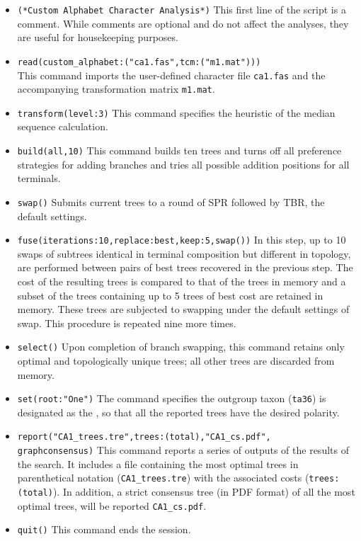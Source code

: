 \begin{itemize}
\item \texttt{(*Custom Alphabet Character Analysis*)} This first
line of the script is a comment. While comments are optional and
do not affect the analyses, they are useful for housekeeping purposes.
\item \texttt{read(custom\_alphabet:("ca1.fas",tcm:("m1.mat")))}\\ 
This command imports the user-defined 
character file \texttt{ca1.fas} and the accompanying transformation
matrix \texttt{m1.mat}.  
\item \texttt{transform(level:3)} This command specifies the 
heuristic  of the median sequence calculation.  
\item \texttt{build(all,10)} This command builds ten trees and 
turns off all preference strategies for adding branches and tries 
all possible addition positions for all terminals.
\item \texttt{swap()} Submits current trees to a round of SPR
followed by TBR, the default settings.  
\item \texttt{fuse(iterations:10,replace:best,keep:5,swap())} In this
step, up to 10 swaps of subtrees identical in terminal composition
but different in topology, are performed between pairs of best trees
recovered in the previous step. The cost of the resulting trees is
compared to that of the trees in memory and a subset of the trees
containing up to 5 trees of best cost are retained in memory. These
trees are subjected to swapping under the default settings of swap.
This procedure is repeated nine more times. 
\item \texttt{select()} Upon completion of branch swapping, this 
command retains only optimal and topologically unique trees; 
all other trees are discarded from memory.  
\item \texttt{set(root:"One")} The  command
specifies the outgroup taxon (\texttt{ta36}) is designated as the
, so that all the reported trees have the desired
polarity.  
\item \texttt{report("CA1\_trees.tre",trees:(total),"CA1\_cs.pdf", \\
graphconsensus)} This command reports a series of outputs of the
results of the search.  It includes a file containing the most
optimal trees in parenthetical notation (\texttt{CA1\_trees.tre})
with the associated costs (\texttt{trees:(total)}).  In addition,
a strict consensus tree (in PDF format) of all the most optimal
trees, will be reported \texttt{CA1\_cs.pdf}.  
\item \texttt{quit()} This command ends the \poy session.
\end{itemize}

